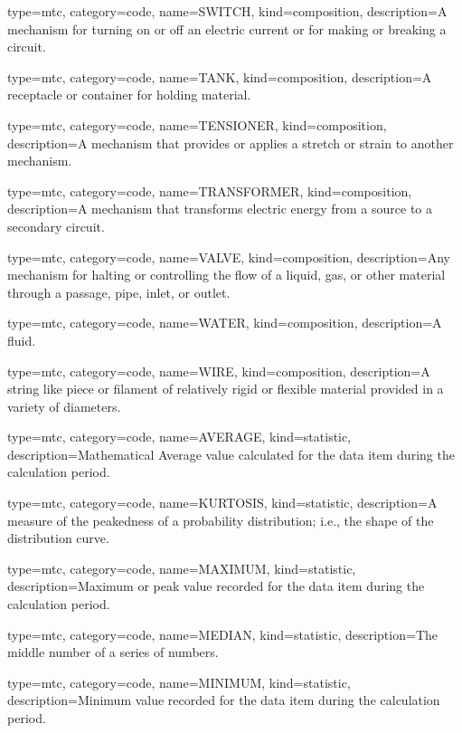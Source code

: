 {
  type=mtc,
  category=code,
  name={SWITCH},
  kind={composition},
  description={A mechanism for turning on or off an electric current or for making or breaking a circuit.}
}


{
  type=mtc,
  category=code,
  name={TANK},
  kind={composition},
  description={A receptacle or container for holding material.}
}


{
  type=mtc,
  category=code,
  name={TENSIONER},
  kind={composition},
  description={A mechanism that provides or applies a stretch or strain to another mechanism.}
}


{
  type=mtc,
  category=code,
  name={TRANSFORMER},
  kind={composition},
  description={A mechanism that transforms electric energy from a source to a secondary circuit.}
}


{
  type=mtc,
  category=code,
  name={VALVE},
  kind={composition},
  description={Any mechanism for halting or controlling the flow of a liquid, gas, or other material through a passage, pipe, inlet, or outlet.}
}


{
  type=mtc,
  category=code,
  name={WATER},
  kind={composition},
  description={A fluid.}
}


{
  type=mtc,
  category=code,
  name={WIRE},
  kind={composition},
  description={A string like piece or filament of relatively rigid or flexible material provided in a variety of diameters.}
}


{
  type=mtc,
  category=code,
  name={AVERAGE},
  kind={statistic},
  description={Mathematical Average value calculated for the data item during the calculation period.}
}


{
  type=mtc,
  category=code,
  name={KURTOSIS},
  kind={statistic},
  description={A measure of the peakedness of a probability distribution; i.e., the shape of the distribution curve.}
}


{
  type=mtc,
  category=code,
  name={MAXIMUM},
  kind={statistic},
  description={Maximum or peak value recorded for the data item during the calculation period.}
}


{
  type=mtc,
  category=code,
  name={MEDIAN},
  kind={statistic},
  description={The middle number of a series of numbers.}
}


{
  type=mtc,
  category=code,
  name={MINIMUM},
  kind={statistic},
  description={Minimum value recorded for the data item during the calculation period.}
}


